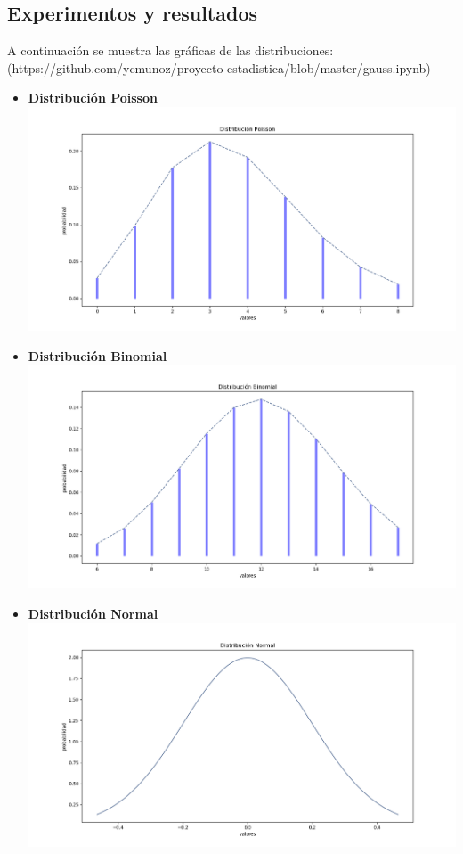 \documentclass[12pt,a4paper]{article}
\begin{document}
\begin{multicols}{2}
\section{Experimentos y resultados}
    A continuación se muestra las gráficas de las distribuciones:\\
    (https://github.com/ycmunoz/proyecto-estadistica/blob/master/gauss.ipynb)
    \begin{itemize}
        \item \textbf{Distribución Poisson}\\
        \includegraphics[scale=0.26]{poisson.png}
        \item \textbf{Distribución Binomial}\\
        \includegraphics[scale=0.26]{binomial.png}
        \item \textbf{Distribución Normal}\\
        \includegraphics[scale=0.26]{normal.png}

\end{itemize}
\end{multicols}
\end{document}
